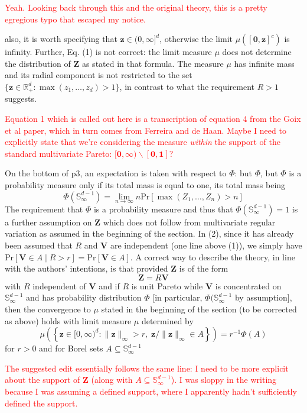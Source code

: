 \documentclass[10pt]{article}
\newcommand{\peter}[1]{\textcolor{red}{#1}}  %
\begin{document}
\peter{Yeah.  Looking back through this and the original theory, this is a pretty egregious typo that escaped my notice.}

also, it is worth specifying that $\bm{z}\in (0, \infty]^d$, otherwise the limit $\mu([\bm{0},\bm{z}]^c)$ is infinity. Further, Eq. (1) is not correct: the limit measure $\mu$ does not determine the distribution of $\bm{Z}$ as stated in that formula. The measure $\mu$ has infinite mass and its radial component is not restricted to the set $\lbrace \bm{z} \in {\mathbb R}_+^d : \max(z_1,\ldots,z_d) > 1\rbrace$, in contrast to what the requirement $R > 1$ suggests. 

\peter{Equation 1 which is called out here is a transcription of equation 4 from the Goix et al paper, which in turn comes from Ferreira and de Haan.  Maybe I need to explicitly state that we're considering the measure \emph{within} the support of the standard multivariate Pareto: $[\bm{0},\bm{\infty})\backslash [\bm{0},\bm{1}]$?}

On the bottom of p3, an expectation is taken with respect to $\Phi$: but $\Phi$, but $\Phi$ is a probability measure only if its total mass is equal to one, its total mass being
\[
    \Phi(\mathbb{S}_{\infty}^{d-1}) = \lim\limits_{n\to\infty} n\text{Pr}\left[\max(Z_1,\ldots,Z_n) > n\right]
\]
The requirement that $\Phi$ is a probability measure and thus that $\Phi(\mathbb{S}_{\infty}^{d-1}) = 1$ is a further assumption on $\bm{Z}$ which does not follow from multivariate regular variation as assumed in the beginning of the section. In (2), since it has already been assumed that $R$ and $\bm{V}$ are independent (one line above (1)), we simply have $\text{Pr}[\bm{V} \in A \mid R > r ] = \text{Pr}[ \bm{V} \in A ]$. A correct way to describe the theory, in line with the authors’ intentions, is that provided $\bm{Z}$ is of the form \[\bm{Z} = R\bm{V}\] with $R$ independent of $\bm{V}$ and if $R$ is unit Pareto while $\bm{V}$ is concentrated on $\mathbb{S}_{\infty}^{d-1}$ and has probability distribution $\Phi$ [in particular, $\Phi(\mathbb{S}_{\infty}^{d-1}$ by assumption], then the convergence to $\mu$ stated in the beginning of the section (to be corrected as above) holds with limit measure $\mu$ determined by
\[
    \mu\left(\left\lbrace  \bm{z} \in [0,\infty)^d : \lVert \bm{z} \rVert_{\infty} > r,\;\bm{z}/\lVert\bm{z}\rVert_{\infty} \in A\right\rbrace \right) = r^{-1}\Phi(A)
\]
for $r > 0$ and for Borel sets $A\subseteq \mathbb{S}_{\infty}^{d-1}$

\peter{The suggested edit essentially follows the same line: I need to be more explicit about the support of $\bm{Z}$ (along with $A\subseteq{\mathbb S}_{\infty}^{d-1}$).  I was sloppy in the writing because I was assuming a defined support, where I apparently hadn't sufficiently defined the support.}
\end{document}
